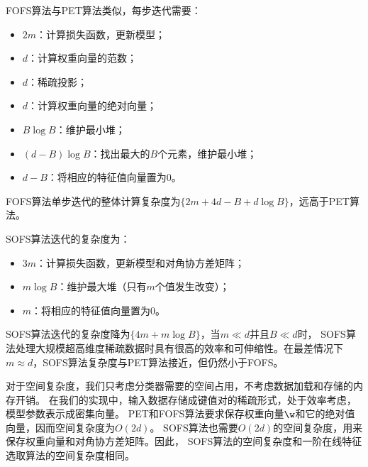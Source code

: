 FOFS算法与PET算法类似，每步迭代需要：
\begin{itemize}
    \item $2m$：计算损失函数，更新模型；
    \item $d$：计算权重向量的范数；
    \item $d$：稀疏投影；
    \item $d$：计算权重向量的绝对向量；
    \item $B\log B$：维护最小堆；
    \item $(d-B)\log B$：找出最大的$B$个元素，维护最小堆；
    \item $d-B$：将相应的特征值向量置为$0$。
\end{itemize}
FOFS算法单步迭代的整体计算复杂度为$\{2m + 4d - B + d\log
B\}$，远高于PET算法。

SOFS算法迭代的复杂度为：
\begin{itemize}
    \item $3m$：计算损失函数，更新模型和对角协方差矩阵；
    \item $m\log B$：维护最大堆（只有$m$个值发生改变）；
    \item $m$：将相应的特征值向量置为$0$。
\end{itemize}
SOFS算法迭代的复杂度降为$\{4m + m\log B\}$，当$m\ll d$并且$B\ll d$时，
SOFS算法处理大规模超高维度稀疏数据时具有很高的效率和可伸缩性。在最差情况下
$m\approx d$，SOFS算法复杂度与PET算法接近，但仍然小于FOFS。

对于空间复杂度，我们只考虑分类器需要的空间占用，不考虑数据加载和存储的内存开销。
在我们的实现中，输入数据存储成键值对的稀疏形式，处于效率考虑，模型参数表示成密集向量。
PET和FOFS算法要求保存权重向量$\w$和它的绝对值向量，因而空间复杂度为$O(2d)$。
SOFS算法也需要$O(2d)$的空间复杂度，用来保存权重向量和对角协方差矩阵。因此，
SOFS算法的空间复杂度和一阶在线特征选取算法的空间复杂度相同。

